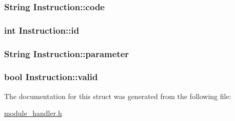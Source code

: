 \subsubsection[{code}]{\setlength{\rightskip}{0pt plus 5cm}String Instruction\+::code}\label{struct_instruction_ad888a5bd187437c04dca0f5574ce4ebd}
\hypertarget{struct_instruction_aca74587d9d1a44daca3b0965af207a4c}{}
\subsubsection[{id}]{\setlength{\rightskip}{0pt plus 5cm}int Instruction\+::id}\label{struct_instruction_aca74587d9d1a44daca3b0965af207a4c}
\hypertarget{struct_instruction_a61c139a5e35c88092611020e999e220d}{}
\subsubsection[{parameter}]{\setlength{\rightskip}{0pt plus 5cm}String Instruction\+::parameter}\label{struct_instruction_a61c139a5e35c88092611020e999e220d}
\hypertarget{struct_instruction_a3951b82b53920c98582baa6be7210180}{}
\subsubsection[{valid}]{\setlength{\rightskip}{0pt plus 5cm}bool Instruction\+::valid}\label{struct_instruction_a3951b82b53920c98582baa6be7210180}


The documentation for this struct was generated from the following file\+:\begin{DoxyCompactItemize}
\item 
\hyperlink{module__handler_8h}{module\+\_\+handler.\+h}\end{DoxyCompactItemize}
